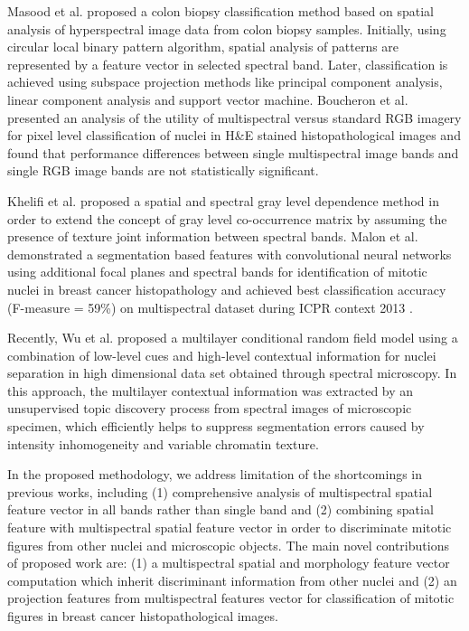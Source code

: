 \documentclass[10pt,twocolumn,letterpaper]{article}
\begin{document}
Masood et al. \cite{masood2009} proposed a colon biopsy classification method based on spatial analysis of hyperspectral image data from colon biopsy samples. Initially, using circular local binary pattern algorithm, spatial analysis of patterns are represented by a feature vector in selected spectral band. Later, classification is achieved using subspace projection methods like principal component analysis, linear component analysis and support vector machine. Boucheron et al. \cite{boucheron2007} presented an analysis of the utility of multispectral versus standard RGB imagery for pixel level classification of nuclei in H\&E stained histopathological images and found that performance differences between single multispectral image bands and single RGB image bands are not statistically significant. 

Khelifi et al. \cite{khelifi2012} proposed a spatial and spectral gray level dependence method in order to extend the concept of gray level co-occurrence matrix by assuming the presence of texture joint information between spectral bands. Malon et al. \cite{malon2013} demonstrated a segmentation based features with convolutional neural networks using additional focal planes and spectral bands for identification of mitotic nuclei in breast cancer histopathology and achieved best classification accuracy (F-measure = 59\%) on multispectral dataset during ICPR context 2013 \cite{roux2013}.

Recently, Wu et al. \cite{wu2012} proposed a multilayer conditional random field model using a combination of low-level cues and high-level contextual information for nuclei separation in high dimensional data set obtained through spectral microscopy. In this approach, the multilayer contextual information was extracted by an unsupervised topic discovery process from spectral images of microscopic specimen, which efficiently helps to suppress segmentation errors caused by intensity inhomogeneity and variable chromatin texture.

In the proposed methodology, we address limitation of the shortcomings in previous works, including (1) comprehensive analysis of multispectral spatial feature vector in all bands rather than single band \cite{masood2009,wu2009,wu2012} and (2) combining spatial feature with multispectral spatial feature vector in order to discriminate mitotic figures from other nuclei and microscopic objects. The main novel contributions of proposed work are: (1) a multispectral spatial and morphology feature vector computation which inherit discriminant information from other nuclei and (2) an projection features from multispectral features vector for classification of mitotic figures in breast cancer histopathological images.
\end{document}
